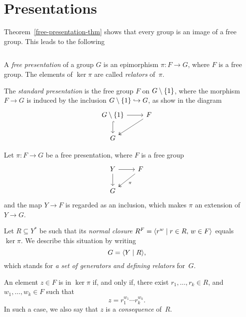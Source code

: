 \section{Presentations}\label{sec:presentations}

Theorem~\ref{free-presentation-thm} shows that every group is an image of a free group. This leads to the following

\begin{defns}\label{defn:presentations}${}$
    
    A \textsl{free presentation} of a group $G$ is an epimorphism $\pi\colon F\to G$, where $F$ is a free group. The elements of $\ker\pi$ are called \textsl{relators} of~$\pi$.

    The \textsl{standard presentation} is the free group $F$ on $G\setminus\{1\}$, where the morphism $F\to G$ is induced by the inclusion $G\setminus\{1\}\hookrightarrow G$, as show in the diagram
    $$
        \begin{tikzcd}
            G\setminus\set1
                    \arrow[d,hook]
                    \arrow[r]
                &F
                    \arrow[ld,two heads]\\
            G
        \end{tikzcd}
    $$

    Let $\pi\colon F\to G$ be a free presentation, where $F$ is a free group
    $$
        \begin{tikzcd}
            Y
                    \arrow[d]
                    \arrow[r]
                &F
                    \arrow[ld,"\pi",two heads]\\
            G
        \end{tikzcd}
    $$
    and the map $Y\to F$ is regarded as an inclusion, which makes $\pi$ an extension of $Y\to G$.
    
    Let $R\subseteq Y^*$ be such that its \textsl{normal closure\/} $R^F=\langle r^w\mid r\in R,\,w\in F\rangle$ equals $\ker\pi$. We describe this situation by writing
    $$
        G = \langle Y\mid R\rangle,
    $$
    which stands for \textsl{a set of generators and defining relators} for~$G$. 
    
    An element $z\in F$ is in $\ker\pi$ if, and only if, there exist $r_1,\dots, r_k\in R$, and $w_1,\dots,w_k\in F$ such that
    \begin{equation}\label{eq.relator}
        z = r_1^{w_1}\cdots r_k^{w_k}.
    \end{equation}
    In such a case, we also say that $z$ is a \textsl{consequence} of~$R$.
    

\end{defns}
